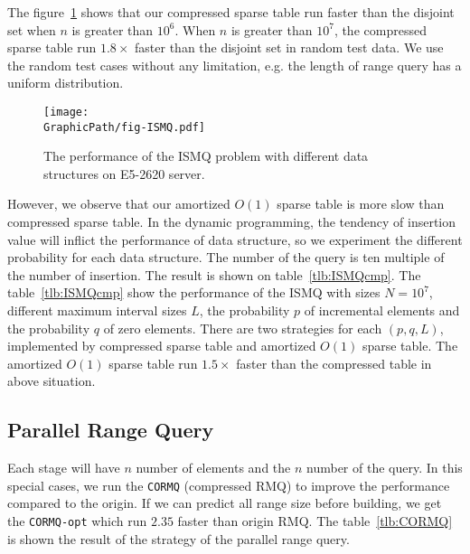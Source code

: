The figure~\ref{fig:fig-ISMQcmp} shows that our compressed sparse table
run faster than the disjoint set when $n$ is greater than  $10^6$.  When
$n$ is greater than $10^7$, the compressed sparse table run $1.8 \times$
faster than the disjoint set in random test data.  We use the
random test cases without any limitation, e.g. the length of range
query has a uniform distribution.

\begin{figure}[!thb]
  \centering
  \texttt{[image: \\GraphicPath/fig-ISMQ.pdf]}
  \caption{
  The performance of the ISMQ problem with different data structures on 
  E5-2620 server.
  }
  \label{fig:fig-ISMQcmp}
\end{figure}

However, we observe that our amortized $O(1)$ sparse table is more
slow than compressed sparse table.  In the dynamic programming, the
tendency of insertion value will inflict the performance of data
structure, so we experiment the different probability for each data
structure.  The number of the query is ten multiple of the number of
insertion.  The result is shown on table~\ref{tlb:ISMQcmp}.  The
table~\ref{tlb:ISMQcmp} show the performance of the ISMQ with sizes $N
= 10^7$, different maximum interval sizes $L$, the probability $p$ of
incremental elements and the probability $q$ of zero elements. There
are two strategies for each $(p, q, L)$, implemented by compressed
sparse table and amortized $O(1)$ sparse table.  The amortized $O(1)$
sparse table run $1.5 \times$ faster than the compressed table in
above situation.

\iffalse 當運行 $n > 10^6$ 時，我們提出的壓縮稀疏表的效能已經勝過并查
集的版本，其運行結果如圖表 ~\ref{fig:fig-ISMQcmp}。在 $n = 10^7$ 時，
加速 $1.25 \times$。然而，我們提供的 amortized $\theta(1)$ 的稀疏表慢
於并查集，我們做了深入的機率探討 (參照表 ~\ref{tlb:ISMQcmp})，由於大部
分的操作都被區塊後綴和前綴解決，沒有實際運用到內部詢問，約束區間詢問的
大小為 $L$，在 $N = 10^7$ 時，最多能加速 $1.26 \times$，其中插入和詢問
比例為 1:10，當詢問比重更大時，將有更明顯的加速。\fi



\subsection{Parallel Range Query}

Each stage will have $n$ number of elements and the $n$ number of the
query.  In this special cases, we run the {\tt CORMQ} (compressed RMQ)
to improve the performance compared to the origin.  If we can predict
all range size before building, we get the {\tt CORMQ-opt} which run
$2.35$ faster than origin RMQ.  The table~\ref{tlb:CORMQ} is shown the
result of the strategy of the parallel range query.

\iffalse 每一次有 $n$ 個元素和 $n$ 組詢問，針對這種特殊性質的問題，我
們運行樸素的 \texttt{CORMQ} (compressed RMQ) 得到效能改善，搭配可預測
的分析降低運算量 (參照 \texttt{CORMQ-opt})，得到更好的改善。在
\texttt{CORMQ-opt} 策略中，得到 $2.35 \times$ 倍的加速，結果如表
~\ref{tlb:CORMQ}。\fi


